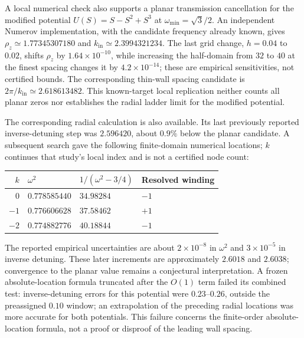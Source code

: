 A local numerical check also supports a planar transmission cancellation
for the modified potential $U(S)=S-S^2+S^3$ at
$\omega_{\min}=\sqrt{3}/2$. An independent Numerov implementation,
with the candidate frequency already known, gives
$\rho_z\simeq1.77345307180$ and $k_{\mathrm{in}}\simeq2.3994321234$.
The last grid change, $h=0.04$ to $0.02$, shifts $\rho_z$ by
$1.64\times10^{-10}$, while increasing the half-domain from $32$ to $40$
at the finest spacing changes it by $4.2\times10^{-14}$; these are
empirical sensitivities, not certified bounds. The corresponding thin-wall
spacing candidate is $2\pi/k_{\mathrm{in}}\simeq2.618613482$. This known-target
local replication neither counts all planar zeros nor establishes the
radial ladder limit for the modified potential.

The corresponding radial calculation is also available. Its last
previously reported inverse-detuning step was $2.596420$, about $0.9\%$
below the planar candidate. A subsequent search gave the following
finite-domain numerical locations; $k$ continues that study's local
index and is not a certified node count:
\begin{center}\small
\begin{tabular}{rlll}\toprule
$k$&$\omega^2$&$1/(\omega^2-3/4)$&Resolved winding\\\midrule
0&$0.778585440$&$34.98284$&$-1$\\
$-1$&$0.776606628$&$37.58462$&$+1$\\
$-2$&$0.774882776$&$40.18844$&$-1$\\\bottomrule
\end{tabular}\end{center}
The reported empirical uncertainties are about $2\times10^{-8}$ in
$\omega^2$ and $3\times10^{-5}$ in inverse detuning. These later
increments are approximately $2.6018$ and $2.6038$; convergence to the
planar value remains a conjectural interpretation. A frozen
absolute-location formula truncated after the $O(1)$ term failed its
combined test: inverse-detuning errors for this potential were
$0.23$--$0.26$, outside the preassigned $0.10$ window; an extrapolation
of the preceding radial locations was more accurate for both potentials.
This failure concerns the finite-order absolute-location formula,
not a proof or disproof of the leading wall spacing.
